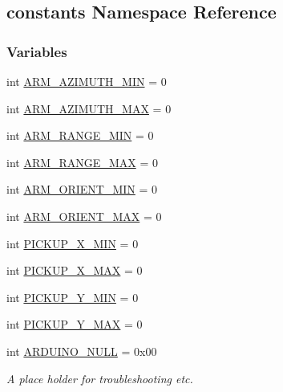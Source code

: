 \hypertarget{namespaceconstants}{}\subsection{constants Namespace Reference}
\label{namespaceconstants}
\subsubsection*{Variables}
\begin{DoxyCompactItemize}
\item 
int \mbox{\hyperlink{namespaceconstants_a8112376fe415e03687dcfcf32508ff5b}{A\+R\+M\+\_\+\+A\+Z\+I\+M\+U\+T\+H\+\_\+\+M\+IN}} = 0
\item 
int \mbox{\hyperlink{namespaceconstants_a32e0792803d2cda1bfc22b90f37f3e3d}{A\+R\+M\+\_\+\+A\+Z\+I\+M\+U\+T\+H\+\_\+\+M\+AX}} = 0
\item 
int \mbox{\hyperlink{namespaceconstants_a185349fe1a4462c42310332cc79acacb}{A\+R\+M\+\_\+\+R\+A\+N\+G\+E\+\_\+\+M\+IN}} = 0
\item 
int \mbox{\hyperlink{namespaceconstants_ac7dbe3d17e1603a0dec2f32acb4adb29}{A\+R\+M\+\_\+\+R\+A\+N\+G\+E\+\_\+\+M\+AX}} = 0
\item 
int \mbox{\hyperlink{namespaceconstants_a04a3b80c0f1a2b5dbb41e8e67d1388ff}{A\+R\+M\+\_\+\+O\+R\+I\+E\+N\+T\+\_\+\+M\+IN}} = 0
\item 
int \mbox{\hyperlink{namespaceconstants_a8d807b2016ecbfc6475116fd0a076e71}{A\+R\+M\+\_\+\+O\+R\+I\+E\+N\+T\+\_\+\+M\+AX}} = 0
\item 
int \mbox{\hyperlink{namespaceconstants_a3665696f70f5b437797e0d13d110420c}{P\+I\+C\+K\+U\+P\+\_\+\+X\+\_\+\+M\+IN}} = 0
\item 
int \mbox{\hyperlink{namespaceconstants_a9ee9486608b258c0590c50f4ede72be5}{P\+I\+C\+K\+U\+P\+\_\+\+X\+\_\+\+M\+AX}} = 0
\item 
int \mbox{\hyperlink{namespaceconstants_af4d50d2aff64fadb62d4a0320240ac84}{P\+I\+C\+K\+U\+P\+\_\+\+Y\+\_\+\+M\+IN}} = 0
\item 
int \mbox{\hyperlink{namespaceconstants_aff4644fbe2c3332f95ddce3081cc34ca}{P\+I\+C\+K\+U\+P\+\_\+\+Y\+\_\+\+M\+AX}} = 0
\item 
int \mbox{\hyperlink{namespaceconstants_a4fc285d2a763b856a59abf7415a88f39}{A\+R\+D\+U\+I\+N\+O\+\_\+\+N\+U\+LL}} = 0x00
\begin{DoxyCompactList}\small\item\em A place holder for troubleshooting etc. \end{DoxyCompactList}\item 

\end{DoxyCompactItemize}
